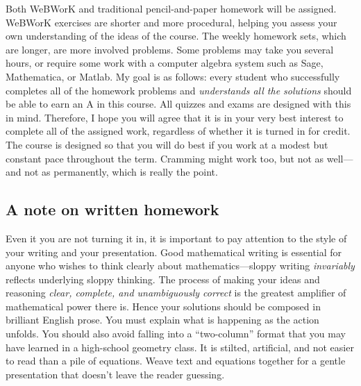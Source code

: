 \documentclass[symmetric]{tufte-handout}
\begin{document}
Both WeBWorK and traditional pencil-and-paper homework will be assigned.
WeBWorK exercises are shorter and more procedural, helping you assess your
own understanding of the ideas of the course. The weekly homework sets, 
which are longer, are more involved problems. Some problems 
may take you several hours, or require some work with a computer algebra
system such as Sage, Mathematica, or Matlab.%
My goal is as follows: every
student who successfully completes all of the homework problems and
\emph{understands all the solutions} should be able to earn an A in this
course. All quizzes and exams are designed with this in mind. Therefore, I
hope you will agree that it is in your very best interest to complete all of
the assigned work, regardless of whether it is turned in for credit. The
course is designed so that you will do best if you work at a modest but
constant pace throughout the term. Cramming might work too, but not as
well—and not as permanently, which is really the point.

\subsection{A note on written homework}

Even it you are not turning it in, it is important to pay attention to the
style of your writing and your presentation. Good mathematical writing is
essential for anyone who wishes to think clearly about mathematics—sloppy
writing \emph{invariably} reflects underlying sloppy thinking. The process of
making your ideas and reasoning \emph{clear, complete, and unambiguously
correct} is the greatest amplifier of mathematical power there is. Hence
your solutions should be composed in brilliant English prose.%
You must explain what is happening as the action unfolds. You should also
avoid falling into a “two-column” format that you may have learned in a 
high-school geometry class. It is stilted, artificial, and not easier to read than
a pile of equations. Weave text and equations together for a gentle
presentation that doesn't leave the reader guessing.
\end{document}
